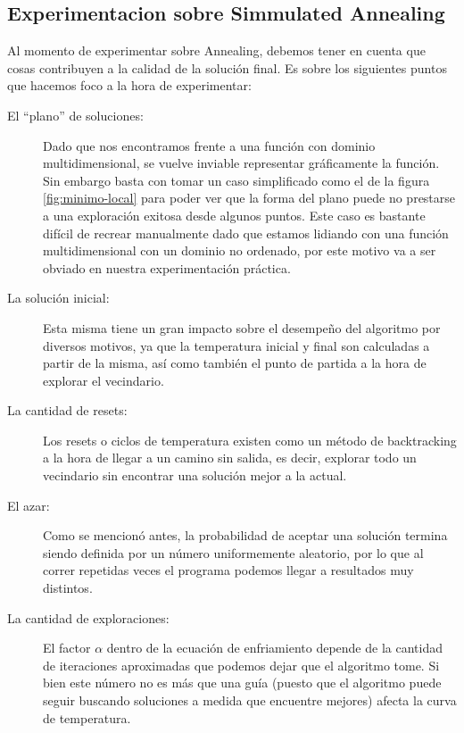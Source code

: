 \subsection{Experimentacion sobre Simmulated Annealing}

Al momento de experimentar sobre Annealing, debemos tener en cuenta que cosas contribuyen a la calidad de la solución final. Es sobre los siguientes puntos que hacemos foco a la hora de experimentar:

\begin{description}
\item[El “plano” de soluciones:] Dado que nos encontramos frente a una función con dominio multidimensional, se vuelve inviable representar gráficamente la función. Sin embargo basta con tomar un caso simplificado como el de la figura \ref{fig:minimo-local} para poder ver que la forma del plano puede no prestarse a una exploración exitosa desde algunos puntos. Este caso es bastante difícil de recrear manualmente dado que estamos lidiando con una función multidimensional con un dominio no ordenado, por este motivo va a ser obviado en nuestra experimentación práctica.

\item[La solución inicial:] Esta misma tiene un gran impacto sobre el desempeño del algoritmo por diversos motivos, ya que la temperatura inicial y final son calculadas a partir de la misma, así como también el punto de partida a la hora de explorar el vecindario. 

\item[La cantidad de resets:] Los resets o ciclos de temperatura existen como un método de backtracking a la hora de llegar a un camino sin salida, es decir, explorar todo un vecindario sin encontrar una solución mejor a la actual.

\item[El azar:] Como se mencionó antes, la probabilidad de aceptar una solución termina siendo definida por un número uniformemente aleatorio, por lo que al correr repetidas veces el programa podemos llegar a resultados muy distintos.

\item[La cantidad de exploraciones:] El factor $\alpha$ dentro de la ecuación de enfriamiento depende de la cantidad de iteraciones aproximadas que podemos dejar que el algoritmo tome. Si bien este número no es más que una guía (puesto que el algoritmo puede seguir buscando soluciones a medida que encuentre mejores) afecta la curva de temperatura. 

\end{description}
